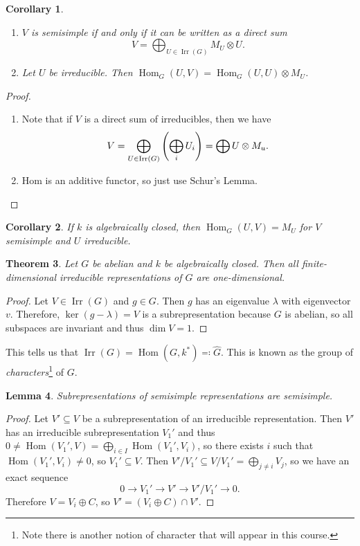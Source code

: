 \documentclass[leqno, openany]{memoir}
\newtheorem{thm}{Theorem}[chapter]
\newtheorem{cor}[thm]{Corollary}
\newtheorem{lem}[thm]{Lemma}
\theoremstyle{definition}
\theoremstyle{remark}
\theoremstyle{plain}
\theoremstyle{definition}
\theoremstyle{remark}
\newcommand{\wh}[1]{\widehat{#1}}
\DeclareMathOperator{\Irr}{\mathrm{Irr}}
\DeclareMathOperator{\Hom}{Hom}
\begin{document}
\begin{cor}
    \hfill
    \begin{enumerate}
        \item $V$ is semisimple if and only if it can be written as a direct sum
            \[ V = \bigoplus_{U \in \Irr(G)} M_U \otimes U. \]
        \item Let $U$ be irreducible. Then $\Hom_G(U,V) = \Hom_G(U,U) \otimes M_U$.
    \end{enumerate}
\end{cor}

\begin{proof}
    \hfill
    \begin{enumerate}
        \item Note that if $V$ is a direct sum of irreducibles, then we have
            \[ V = \bigoplus_{U \in\Irr(G)} \qty( \bigoplus_{i} U_i ) = \bigoplus U \otimes M_u. \]
        \item Hom is an additive functor, so just use Schur's Lemma.
    \end{enumerate}
\end{proof}

\begin{cor}
    If $k$ is algebraically closed, then $\Hom_G(U,V) = M_U$ for $V$ semisimple and $U$ irreducible.
\end{cor}

\begin{thm}
    Let $G$ be abelian and $k$ be algebraically closed. Then all finite-dimensional irreducible representations of $G$ are one-dimensional.
\end{thm}

\begin{proof}
    Let $V \in \Irr(G)$ and $g \in G$. Then $g$ has an eigenvalue $\lambda$ with eigenvector $v$. Therefore, $\ker(g - \lambda) = V$ is a subrepresentation because $G$ is abelian, so all subspaces are invariant and thus $\dim V = 1$.
\end{proof}

This tells us that $\Irr(G) = \Hom(G, k^*) \eqqcolon \wh{G}$. This is known as the group of \textit{characters}\footnote{Note there is another notion of character that will appear in this course.} of $G$.

\begin{lem}
    Subrepresentations of semisimple representations are semisimple.
\end{lem}

\begin{proof}
    Let $V' \subseteq V$ be a subrepresentation of an irreducible representation. Then $V'$ has an irreducible subrepresentation $V_1'$ and thus $0 \neq \Hom(V_1', V) = \bigoplus_{i \in I} \Hom(V_1', V_i)$, so there exists $i$ such that $\Hom(V_1', V_i) \neq 0$, so $V_1' \subseteq V$. Then $V' / V_1' \subseteq V / V_1' = \bigoplus_{j \neq i} V_j$, so we have an exact sequence
    \[ 0 \to V_1' \to V' \to V'/V_1' \to 0. \]
    Therefore $V = V_i \oplus C$, so $V' = (V_i \oplus C) \cap V'$.
\end{proof}
\end{document}
